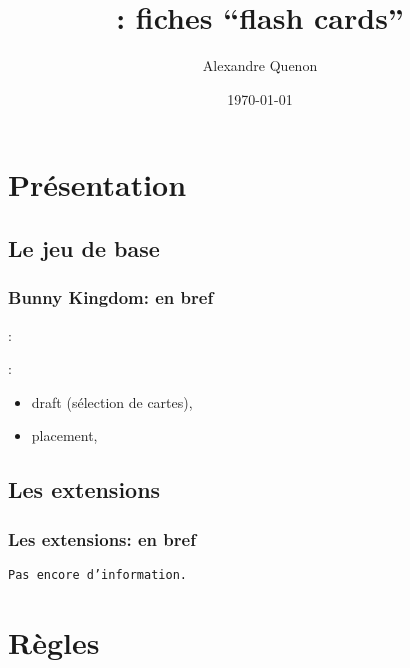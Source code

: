 \documentclass[11pt]{beamer}
\title[\thegame{} : fiches]{\thegame{}: fiches \enquote{flash cards}}
\author[A. Quenon]{Alexandre Quenon}
\date{\today}
\newcommand{\thegame}{Bunny Kingdom}
\begin{document}
\frame{\titlepage}


\begin{frame}
	\tableofcontents
\end{frame}



\section{Présentation}


\subsection{Le jeu de base}

	\begin{frame}
		\frametitle{\thegame{}: en bref}
		
		:
	
		\vspace*{1ex}
		
		:
		\begin{itemize}
			\item draft (sélection de cartes),
			\item placement,
		\end{itemize}
	\end{frame}


\subsection{Les extensions}

	\begin{frame}
		\frametitle{Les extensions: en bref}
		
		\texttt{Pas encore d'information.}
	\end{frame}



\section{Règles}
\end{document}
